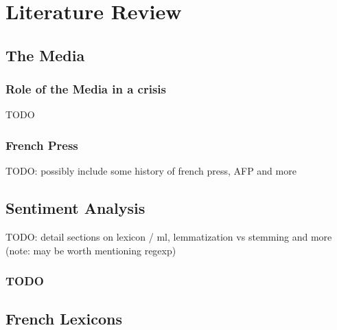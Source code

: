 \chapter{Literature Review}\label{Literature Review}

\section{The Media}

\subsection{Role of the Media in a crisis}\label{Role of the Media in a crisis}

TODO

\subsection{French Press}\label{chap:French Press}

TODO: possibly include some history of french press, AFP and more

\section{Sentiment Analysis}\label{Sentiment Analysis}

TODO: detail sections on lexicon / ml, lemmatization vs stemming and more (note: may be worth mentioning regexp)

\subsection{TODO}

\label{lemmatization}


\section{French Lexicons}\label{French Lexicons}

